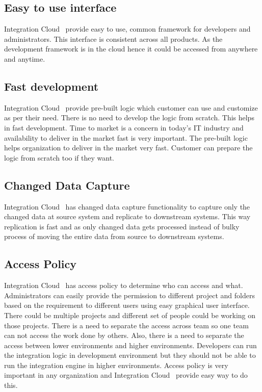 \subsection{Easy to use interface}

Integration Cloud~\cite{hid-sp18-511-iics} provide easy to use, common
framework for developers and administrators. This interface is
consistent across all products. As the development framework is in the
cloud hence it could be accessed from anywhere and anytime.

\subsection{Fast development}

Integration Cloud~\cite{hid-sp18-511-iics} provide pre-built logic
which customer can use and customize as per their need. There is no
need to develop the logic from scratch. This helps in fast
development. Time to market is a concern in today's IT industry and
availability to deliver in the market fast is very important. The
pre-built logic helps organization to deliver in the market very
fast. Customer can prepare the logic from scratch too if they want.

\subsection{Changed Data Capture}

Integration Cloud~\cite{hid-sp18-511-iics} has changed data capture
functionality to capture only the changed data at source system and
replicate to downstream systems. This way replication is fast and as
only changed data gets processed instead of bulky process of moving
the entire data from source to downstream systems.

\subsection{Access Policy}

Integration Cloud~\cite{hid-sp18-511-iics} has access policy to
determine who can access and what. Administrators can easily provide
the permission to different project and folders based on the
requirement to different users using easy graphical user
interface. There could be multiple projects and different set of
people could be working on those projects. There is a need to separate
the access across team so one team can not access the work done by
others. Also, there is a need to separate the access between lower
environments and higher environments. Developers can run the
integration logic in development environment but they should not be
able to run the integration engine in higher environments. Access
policy is very important in any organization and Integration
Cloud~\cite{hid-sp18-511-iics} provide easy way to do this.

